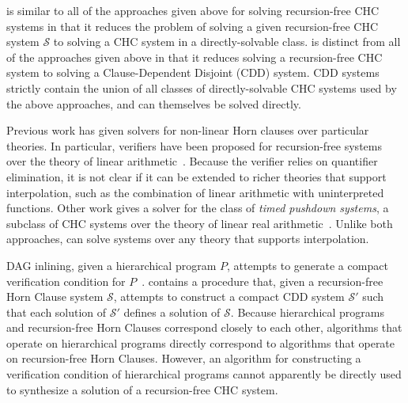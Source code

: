 \sys is similar to all of the approaches given above for solving
recursion-free CHC systems in that it reduces the problem of solving a
given recursion-free CHC system $\mathcal{S}$ to solving a CHC system
in a directly-solvable class.
%
\sys is distinct from all of the approaches given above in that it
reduces solving a recursion-free CHC system to solving a
Clause-Dependent Disjoint (CDD) system.
%
CDD systems strictly contain the union of all classes of
directly-solvable CHC systems used by the above approaches, and can
themselves be solved directly.

Previous work has given solvers for non-linear Horn clauses over
particular theories.
%
In particular, verifiers have been proposed for recursion-free systems
over the theory of linear arithmetic~\cite{komuravelli14}.
%
Because the verifier relies on quantifier elimination, it is not clear
if it can be extended to richer theories that support interpolation,
such as the combination of linear arithmetic with uninterpreted
functions.
%
Other work gives a solver for the class of \emph{timed pushdown
  systems}, a subclass of CHC systems over the theory of linear real
arithmetic~\cite{hoder12}.
%
Unlike both approaches, \sys can solve systems over any theory that
supports interpolation.

DAG inlining, given a hierarchical program $P$, attempts to generate a
compact verification condition for $P$~\cite{lal-qadeer15}.
%
\sys contains a procedure that, given a recursion-free Horn Clause
system $\mathcal{S}$, attempts to construct a compact CDD system
$\mathcal{S}'$ such that each solution of $\mathcal{S}'$ defines a
solution of $\mathcal{S}$.
%
Because hierarchical programs and recursion-free Horn Clauses
correspond closely to each other, algorithms that operate on
hierarchical programs directly correspond to algorithms that operate
on recursion-free Horn Clauses.
%
However, an algorithm for constructing a verification condition of
hierarchical programs cannot apparently be directly used to synthesize
a solution of a recursion-free CHC system.

